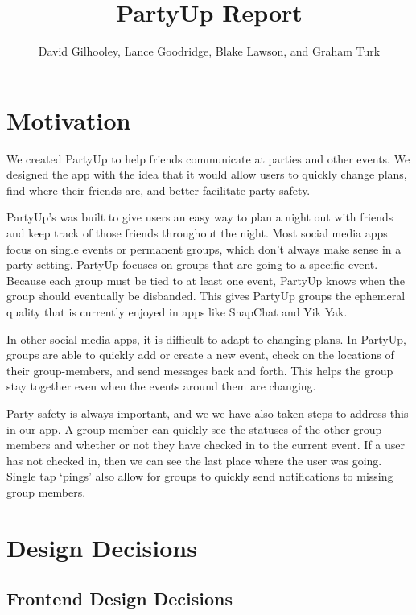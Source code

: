 \documentclass[12pt]{article}
\title{PartyUp Report}
\author{David Gilhooley, Lance Goodridge, Blake Lawson, and Graham Turk}
\begin{document}
\pagestyle{plain}

\maketitle

\section{Motivation} %
\label{sec:Motivation}
We created PartyUp to help friends communicate at parties and other events.
We designed the app with the idea that it would allow users to quickly change plans, find where their friends are, and better facilitate party safety.

PartyUp's was built to give users an easy way to plan a night out with friends and keep track of those friends throughout the night.
Most social media apps focus on single events or permanent groups, which don't always make sense in a party setting.
PartyUp focuses on groups that are going to a specific event.
Because each group must be tied to at least one event, PartyUp knows when the group should eventually be disbanded.
This gives PartyUp groups the ephemeral quality that is currently enjoyed in apps like SnapChat and Yik Yak.

In other social media apps, it is difficult to adapt to changing plans.
In PartyUp, groups are able to quickly add or create a new event, check on the locations of their group-members, and send messages back and forth. This helps the group stay together even when the events around them are changing. 

Party safety is always important, and we we have also taken steps to address this in our app. A group member can quickly see the statuses of the other group members and whether or not they have checked in to the current event. If a user has not checked in, then we can see the last place where the user was going. Single tap `pings' also allow for groups to quickly send notifications to missing group members.

\section{Design Decisions} %
\label{sec:design_decisions}


\subsection{Frontend Design Decisions}
\end{document}
